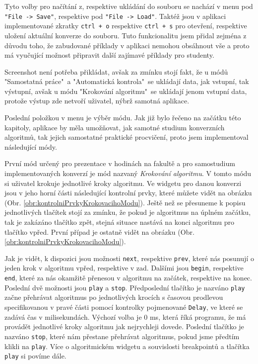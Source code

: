 


Tyto volby pro načítání z, respektive ukládání do souboru se nachází v menu pod \texttt{"File -> Save"}, respektive pod \texttt{"File -> Load"}. Taktéž jsou v aplikaci implementované zkratky \texttt{ctrl + o} respektive \texttt{ctrl + s} pro otevření, respektive uložení aktuální konverze do souboru. Tuto funkcionalitu jsem přidal zejména z důvodu toho, že zabudované příklady v aplikaci nemohou obsáhnout vše a proto má vyučující možnost připravit další zajímavé příklady pro studenty.  

Screenshot není potřeba přikládat, avšak za zmínku stojí fakt, že u módů "Samostatná práce"\ a "Automatická kontrola"\ se ukládají data, jak vstupní, tak výstupní, avšak u módu "Krokování algoritmu"\ se ukládají jenom vstupní data, protože výstup zde netvoří uživatel, nýbrž samotná aplikace.


Poslední položkou v menu je výběr módu. Jak již bylo řečeno na začátku této kapitoly, aplikace by měla umožňovat, jak samotné studium konverzních algoritmů, tak jejich samostatné praktické procvičení, proto jsem implementoval následující módy.


První mód určený pro prezentace v hodinách na fakultě a pro samostudium implementovaných konverzí je mód nazvaný \textit{Krokování algoritmu}. V tomto módu si uživatel krokuje jednotlivé kroky algoritmu. Ve widgetu pro danou konverzi jsou v jeho horní části následující kontrolní prvky, které můžete vidět na obrázku (Obr. \ref{obr:kontrolniPrvkyKrokovacihoModu}). Ještě než se přesuneme k popisu jednotlivých tlačítek stojí za zmínku, že pokud je algoritmus na úplném začátku, tak je zakázáno tlačítko zpět, stejná situace nastává na konci algoritmu pro tlačítko vpřed. První případ je ostatně vidět na obrázku (Obr. \ref{obr:kontrolniPrvkyKrokovacihoModu}).


Jak je vidět, k dispozici jsou možnosti \texttt{next}, respektive \texttt{prev}, které nás posunují o jeden krok v algoritmu vpřed, respektive v zad. Dalšími jsou \texttt{begin}, respektive \texttt{end}, které za nás okamžitě přenesou v algoritmu na začátek, respektive na konec. Poslední dvě možnosti jsou \texttt{play} a \texttt{stop}. Předposlední tlačítko je nazváno \texttt{play} začne přehrávat algoritmus po jednotlivých krocích s časovou prodlevou specifikovanou v pravé části pomocí kontrolky pojmenované \texttt{Delay}, ve které se zadává čas v milisekundách. Výchozí volba je 0 ms, která říká programu, že má provádět jednotlivé kroky algoritmu jak nejrychleji dovede. Poslední tlačítko je nazváno \texttt{stop}, které nám přestane přehrávat algoritmus, pokud jsme předtím klikli na \texttt{play}. Více o algoritmickém widgetu a souvislosti breakpointů a tlačítka \texttt{play} si povíme dále.

